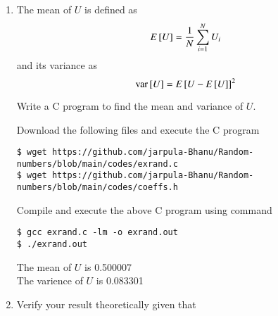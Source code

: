 \documentclass[journal,12pt,twocolumn]{IEEEtran}
\renewcommand\thesection{\arabic{section}}
\begin{document}
\begin{enumerate}[label=\thesection.\arabic*
,ref=\thesection.\theenumi]
\solution Since $U$ is a uniformly distributed in [0,1]  \\
We have three cases:
\begin{itemize}
\item $x < 0$: $P_X(x) = 0$, and hence $F_U(x) = 0$.
\item $0 \leq x < 1$: Here,
\begin{align}
    F_U(x) = \int_{0}^{x}du = x
\end{align}
\item $x \geq 1$: Put $x = 1$ in above eqn we get $F_U(x) = 1$.
\end{itemize}
Therefore,
\begin{align}
    F_U(x) = 
    \begin{cases}
        0 & x < 0 \\
        x & 0 \leq x < 1 \\
        1 & x \geq 1
    \end{cases}
\end{align}
This can be verified from Fig. \ref{fig:uni_cdf} 

\item
The mean of $U$ is defined as
%
\begin{equation}
E{}\left[U\right] = \frac{1}{N}\sum_{i=1}^{N}U_i
	\label{eq:mean-form}
\end{equation}
%
and its variance as
%
\begin{equation}
\text{var}{}\left[U\right] = E{}\left[U- E{}\left[U\right]\right]^2 
	\label{eq:var-form}
\end{equation}

Write a C program to  find the mean and variance of $U$.

\solution Download the following files and execute the C program
\begin{lstlisting}
$ wget https://github.com/jarpula-Bhanu/Random-numbers/blob/main/codes/exrand.c
$ wget https://github.com/jarpula-Bhanu/Random-numbers/blob/main/codes/coeffs.h
\end{lstlisting}
Compile and execute the above C program using command
\begin{lstlisting}
$ gcc exrand.c -lm -o exrand.out
$ ./exrand.out
\end{lstlisting}

The mean of $U$ is 0.500007\\
The varience of $U$ is 0.083301 \\

\item Verify your result theoretically given that
\end{enumerate}
\end{document}
